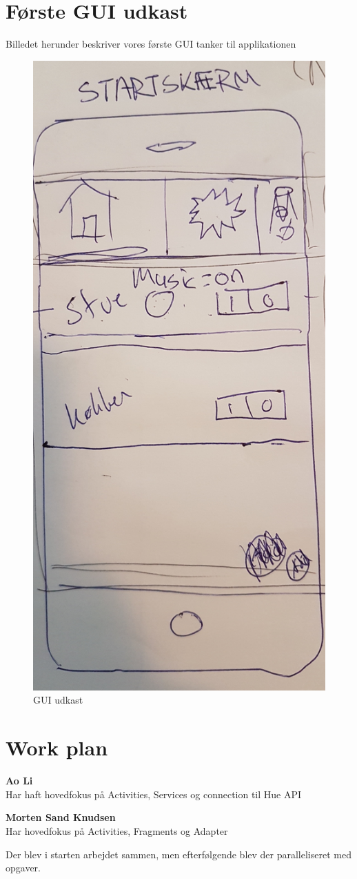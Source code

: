 		\section{Første GUI udkast}
		Billedet herunder beskriver vores første GUI tanker til applikationen
		\begin{figure}[H]
			\centering
			\includegraphics[width=0.6\linewidth, height=1\linewidth]{Kravspecifikation/GUI}
			\caption{GUI udkast}
			\label{fig:GUI udkast}
		\end{figure}
	
		\section{Work plan}
		\textbf{Ao Li} \\
		Har haft hovedfokus på Activities, Services og connection til Hue API
		
		\textbf{Morten Sand Knudsen} \\
		Har hovedfokus på Activities, Fragments og Adapter 
		
		Der blev i starten arbejdet sammen, men efterfølgende blev der paralleliseret med opgaver. 
		
	